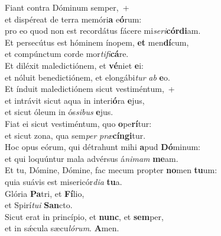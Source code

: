 \evenverse Fiant contra Dóminum semper,~+\\\evenverse  et dispéreat de terra memóri\textbf{a} e\textbf{ó}rum:~\*\\
\evenverse pro eo quod non est recordátus fácere mi\textit{se}\textit{ri}\textbf{cór}\textbf{di}am.\\
\oddverse Et persecútus est hóminem ínopem, \textbf{et} men\textbf{dí}cum,~\*\\
\oddverse et compúnctum corde mor\textit{ti}\textit{fi}\textbf{cá}re.\\
\evenverse Et diléxit maledictiónem, et \textbf{vé}niet \textbf{e}i:~\*\\
\evenverse et nóluit benedictiónem, et elongábi\textit{tur} \textit{ab} \textbf{e}o.\\
\oddverse Et índuit maledictiónem sicut vestiméntum,~+\\
\oddverse  et intrávit sicut aqua in interi\textbf{ó}ra \textbf{e}jus,~\*\\
\oddverse et sicut óleum in ós\textit{si}\textit{bus} \textbf{e}jus.\\
\evenverse Fiat ei sicut vestiméntum, quo \textbf{o}pe\textbf{rí}tur:~\*\\
\evenverse et sicut zona, qua sem\textit{per} \textit{præ}\textbf{cín}\textbf{gi}tur.\\
\oddverse Hoc opus eórum, qui détrahunt mihi \textbf{a}pud \textbf{Dó}minum:~\*\\
\oddverse et qui loquúntur mala advérsus á\textit{ni}\textit{mam} \textbf{me}am.\\
\evenverse Et tu, Dómine, Dómine, fac mecum propter \textbf{no}men \textbf{tu}um:~\*\\
\evenverse quia suávis est misericór\textit{di}\textit{a} \textbf{tu}a.\\
\oddverse Glória \textbf{Pa}tri, et \textbf{Fí}lio,~\*\\
\oddverse et Spirí\textit{tu}\textit{i} \textbf{San}cto.\\
\evenverse Sicut erat in princípio, et \textbf{nunc}, et \textbf{sem}per,~\*\\
\evenverse et in sǽcula sæcu\textit{ló}\textit{rum}. \textbf{A}men.\\
